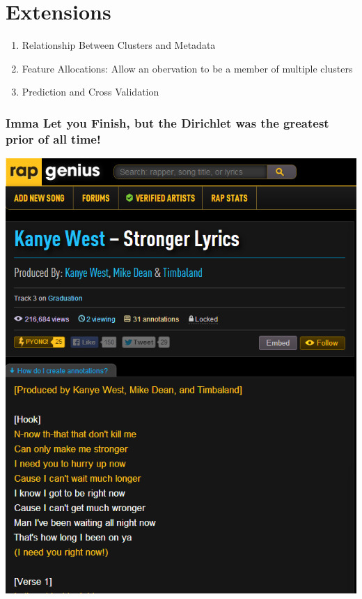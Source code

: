 \documentclass{beamer}
\begin{document}
\section{Extensions}
\begin{frame}
\begin{enumerate}
\item<+-> Relationship Between Clusters and Metadata
\item<+-> Feature Allocations: Allow an obervation to be a member of multiple clusters
\item<+-> Prediction and Cross Validation
\end{enumerate}
\end{frame}

\begin{frame}
\frametitle{Imma Let you Finish, but the Dirichlet was the greatest prior of all time!}
\pause
\begin{center}
\includegraphics[height=1.0\textheight]{Images/lyrics_sample.png}
\end{center}
\end{frame}
\end{document}
